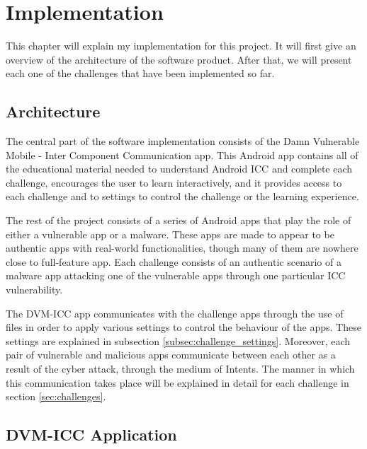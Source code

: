 \chapter{Implementation}
    \label{chap:implementation}

   This chapter will explain my implementation for this project. It will first give an overview of the architecture of the software product. After that, we will present each one of the challenges that have been implemented so far.

    \section{Architecture} 
        \label{sec:architecture}
        
    The central part of the software implementation consists of the Damn Vulnerable Mobile - Inter Component Communication app. This Android app contains all of the educational material needed to understand Android ICC and complete each challenge, encourages the user to learn interactively,  and it provides access to each challenge and to settings to control the challenge or the learning experience. 
    
    The rest of the project consists of a series of Android apps that play the role of either a vulnerable app or a malware. These apps are made to appear to be authentic apps with real-world functionalities, though many of them are nowhere close to full-feature app. Each challenge consists of an authentic scenario of a malware app attacking one of the vulnerable apps through one particular ICC vulnerability.
    
    The DVM-ICC app communicates with the challenge apps through the use of files in order to apply various settings to control the behaviour of the apps. These settings are explained in subsection \ref{subsec:challenge_settings}. Moreover, each pair of vulnerable and malicious apps communicate between each other as a result of the cyber attack, through the medium of Intents. The manner in which this communication takes place will be explained in detail for each challenge in section \ref{sec:challenges}.
    
    \section{DVM-ICC Application}
        \label{sec:home_app}
        
